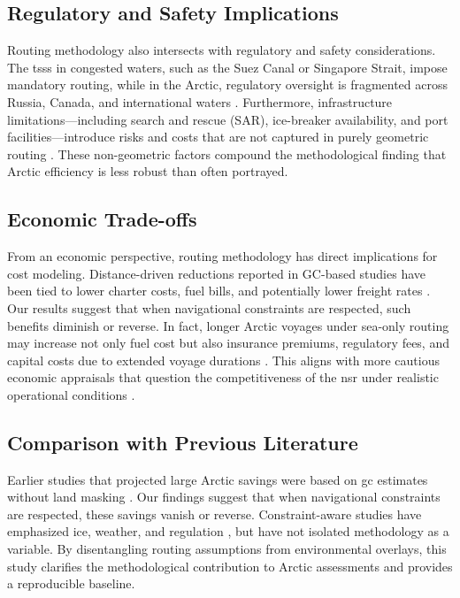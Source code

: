 \subsection{Regulatory and Safety Implications}
Routing methodology also intersects with regulatory and safety considerations. The \acp{tss} in congested waters, such as the Suez Canal or Singapore Strait, impose mandatory routing, while in the Arctic, regulatory oversight is fragmented across Russia, Canada, and international waters \citep{Moe2014,Suer2021}. Furthermore, infrastructure limitations---including search and rescue (SAR), ice-breaker availability, and port facilities---introduce risks and costs that are not captured in purely geometric routing \citep{Lasserre2014,IAPH2013}. These non-geometric factors compound the methodological finding that Arctic efficiency is less robust than often portrayed.

\subsection{Economic Trade-offs}
From an economic perspective, routing methodology has direct implications for cost modeling. Distance-driven reductions reported in GC-based studies have been tied to lower charter costs, fuel bills, and potentially lower freight rates \citep{Bekkers2018,Ho2019}. Our results suggest that when navigational constraints are respected, such benefits diminish or reverse. In fact, longer Arctic voyages under sea-only routing may increase not only fuel cost but also insurance premiums, regulatory fees, and capital costs due to extended voyage durations \citep{Suer2021}. This aligns with more cautious economic appraisals that question the competitiveness of the \ac{nsr} under realistic operational conditions \citep{Lasserre2014,Moe2014}.

\subsection{Comparison with Previous Literature}
Earlier studies that projected large Arctic savings were based on \ac{gc} estimates without land masking \citep{LiuKronbak2010,Yumashev2017,Sur2020}. Our findings suggest that when navigational constraints are respected, these savings vanish or reverse. Constraint-aware studies have emphasized ice, weather, and regulation \citep{Melia2016,Aksenov2017,Nguyen2020,Li2021}, but have not isolated methodology as a variable. By disentangling routing assumptions from environmental overlays, this study clarifies the methodological contribution to Arctic assessments and provides a reproducible baseline.

